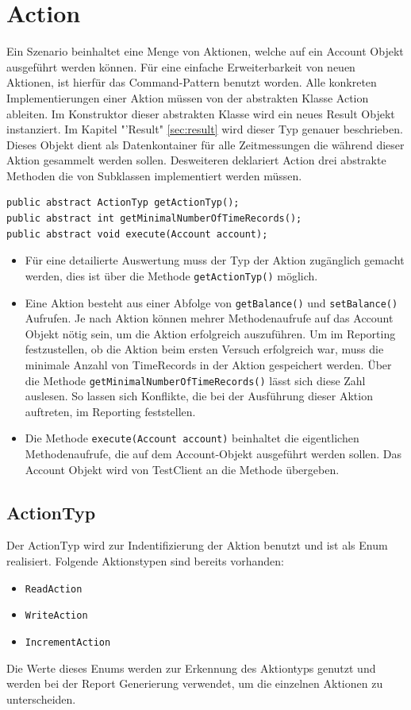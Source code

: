 \section{Action}
\label{sec:action}
Ein Szenario beinhaltet eine Menge von Aktionen, welche auf ein Account Objekt ausgeführt werden können. Für eine einfache Erweiterbarkeit von neuen Aktionen, ist hierfür das Command-Pattern benutzt worden. Alle konkreten Implementierungen einer Aktion müssen von der abstrakten Klasse Action ableiten. Im Konstruktor dieser abstrakten Klasse wird ein neues Result Objekt instanziert. Im Kapitel "'Result" \ref{sec:result} wird dieser Typ genauer beschrieben. Dieses Objekt dient als Datenkontainer für alle Zeitmessungen die während dieser Aktion gesammelt werden sollen. Desweiteren deklariert Action drei abstrakte Methoden die von Subklassen implementiert werden müssen.
\begin{verbatim}	
public abstract ActionTyp getActionTyp();
public abstract int getMinimalNumberOfTimeRecords();
public abstract void execute(Account account);	
\end{verbatim}

\begin{itemize}
\item Für eine detailierte Auswertung muss der Typ der Aktion zugänglich gemacht werden, dies ist über die Methode \verb+getActionTyp()+ möglich.
\item Eine Aktion be\-steht aus einer Ab\-folge von \texttt{get\allowbreak Balance()} und \texttt{set\allowbreak Balance()} Auf\-rufen. Je nach Aktion können mehrer Methodenaufrufe auf das Account Objekt nötig sein, um die Aktion erfolgreich aus\-zu\-füh\-ren. Um im Reporting fest\-zu\-stellen, ob die Aktion beim ersten Versuch erfolg\-reich war, muss die minimale Anzahl von Time\-Records in der Aktion ge\-speichert werden. Über die Me\-tho\-de \texttt{get\allowbreak Minimal\allowbreak Number\allowbreak Of\allowbreak Time\allowbreak Records()} lässt sich diese Zahl auslesen. So lassen sich Konflikte, die bei der Ausführung dieser Aktion auftreten, im Reporting feststellen.
\item Die Methode \verb+execute(Account account)+ beinhaltet die eigentlichen Methodenaufrufe, die auf dem Account-Objekt ausgeführt werden sollen. Das Account Objekt wird von TestClient an die Methode übergeben.
\end{itemize} 

\subsection{ActionTyp}
\label{sec:actionTyp}
Der ActionTyp wird zur Indentifizierung der Aktion benutzt und ist als Enum realisiert. Folgende Aktionstypen sind bereits vorhanden:
\begin{itemize}
\item \verb+ReadAction+
\item \verb+WriteAction+
\item \verb+IncrementAction+
\end{itemize}
Die Werte dieses Enums werden zur Erkennung des Aktiontyps genutzt und werden bei der Report Generierung verwendet, um die einzelnen Aktionen zu unterscheiden.

